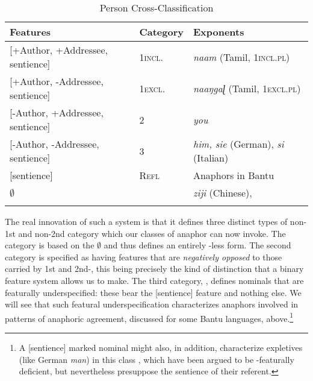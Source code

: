 \documentclass[output=paper, modfonts, nonflat]{langsci/langscibook}
\begin{document}
\begin{table}[h]
  \caption{Person Cross-Classification}
\label{fper}
\begin{tabular}{lll}
  \lsptoprule
  \textbf{Features} & \textbf{Category} & \textbf{Exponents}\\  
  \midrule
  {[+Author, +Addressee, sentience]} & \textsc{1incl.} & \textit{naam}
                                                         (Tamil, \textsc{1incl.pl})\\
  {[+Author, -Addressee, sentience]} &  \textsc{1excl.} &
                                                          \textit{naaŋgaɭ}
                                                          (Tamil, \textsc{1excl.pl})\\
  {[-Author, +Addressee, sentience]} & \textsc{2} & \textit{you}\\
  {[-Author, -Addressee, sentience]} & \textsc{3} & \textit{him,
                                                    sie} (German), \textit{si} (Italian)\\
  \midrule
  {[sentience]} & \textsc{Refl} & Anaphors in Bantu\\
  $\emptyset$ & \nul{} & \textit{ziji} (Chinese),
  \\
  \lspbottomrule
    \end{tabular}
  \end{table} \noindent 
  The real innovation of such a system is that it defines three
  distinct types of non-1st and non-2nd \person{} category which our
  classes of anaphor can now invoke. The \nul{} category is based on
  the $\emptyset$ and thus defines an entirely \person-less form.  The
  second category is specified as having \person{} features that are
  \emph{negatively opposed} to those carried by 1st and 2nd-\person,
  this being precisely the kind of distinction that a binary feature
  system allows us to make. The third category, , defines
  nominals that are featurally underspecified: these bear the
  [sentience] feature and nothing else. We will see that such featural
  underspecification characterizes anaphors involved in patterns of
  anaphoric agreement, discussed for some Bantu languages,
  above.\footnote{A [sentience] marked nominal
    might also, in addition, characterize expletives (like German
    \textit{man}) in this class \citep{nevins:2007, ackneeleman:app},
    which have been argued to be \ph-featurally deficient, but
    nevertheless presuppose the sentience of their referent.}
\end{document}
